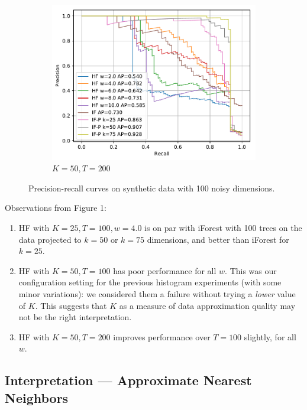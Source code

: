 \documentclass[11pt,onecolumn]{article}
\begin{document}
\begin{figure}[ht!]
\begin{subfigure}[t]{0.32\textwidth}
        \includegraphics[width=\linewidth]{fig/k50T200_prcurves.pdf}
        \caption{$K=50, T=200$}
    \end{subfigure}
    \caption{Precision-recall curves on synthetic data with 100 noisy dimensions.}
\end{figure}

Observations from Figure 1:
\begin{enumerate}
	\item HF with $K = 25, T=100, w=4.0$ is on par with iForest with 100 trees on the data projected to $k = 50$ or $k = 75$ dimensions, and better than iForest for $k=25$.

	\item HF with $K = 50, T=100$ has poor performance for all $w$. This was our configuration setting for the previous histogram experiments (with some minor variations): we considered them a failure without trying a \textit{lower} value of $K$. This suggests that $K$ as a measure of data approximation quality may not be the right interpretation.

	\item HF with $K = 50, T=200$ improves performance over $T=100$ slightly, for all $w$.
\end{enumerate}

\subsection{Interpretation --- Approximate Nearest Neighbors}
\end{document}
